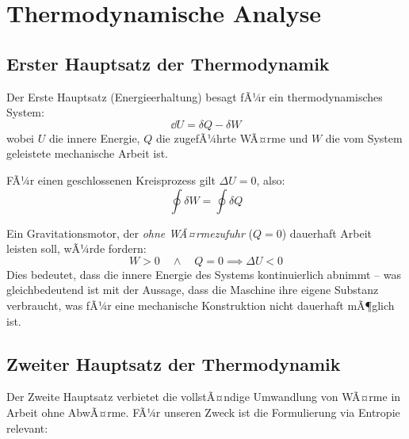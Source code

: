 ﻿\documentclass[12pt, a4paper]{report}
\theoremstyle{definition}
\theoremstyle{remark}
\begin{document}
\chapter{Thermodynamische Analyse}
\label{sec:thermodynamik}

\section{Erster Hauptsatz der Thermodynamik}

Der Erste Hauptsatz (Energieerhaltung) besagt fÃ¼r ein thermodynamisches System:
\begin{equation}
  \dd U = \delta Q - \delta W
  \label{eq:1hs}
\end{equation}
wobei $U$ die innere Energie, $Q$ die zugefÃ¼hrte WÃ¤rme und $W$ die vom System
geleistete mechanische Arbeit ist.

FÃ¼r einen geschlossenen Kreisprozess gilt $\Delta U = 0$, also:
\begin{equation}
  \oint \delta W = \oint \delta Q
\end{equation}

Ein Gravitationsmotor, der \emph{ohne WÃ¤rmezufuhr} ($Q = 0$) dauerhaft Arbeit
leisten soll, wÃ¼rde fordern:
\begin{equation}
  W > 0 \quad \wedge \quad Q = 0 \implies \Delta U < 0
\end{equation}
Dies bedeutet, dass die innere Energie des Systems kontinuierlich abnimmt --
was gleichbedeutend ist mit der Aussage, dass die Maschine ihre eigene
Substanz verbraucht, was fÃ¼r eine mechanische Konstruktion nicht dauerhaft
mÃ¶glich ist.

\section{Zweiter Hauptsatz der Thermodynamik}

Der Zweite Hauptsatz verbietet die vollstÃ¤ndige Umwandlung von WÃ¤rme in Arbeit
ohne AbwÃ¤rme. FÃ¼r unseren Zweck ist die Formulierung via Entropie relevant:
\end{document}
